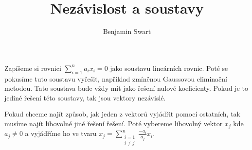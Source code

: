 \documentclass{article}
\title{Nezávislost a soustavy}
\author{Benjamin Swart}
\begin{document}
Zapíšeme si rovnici $\sum_{i=1}^{n}{a_i x_i} = 0$ jako soustavu lineárních rovnic. Poté se pokusíme tuto soustavu vyřešit, například zmíněnou Gaussovou eliminační metodou. Tato soustava bude vždy mít jako řešení nulové koeficienty. Pokud je to jediné řešení této soustavy, tak jsou vektory nezávislé.

Pokud chceme najít způsob, jak jeden z vektorů vyjádřit pomocí ostatních, tak musíme najít libovolné jiné řešení řešení. Poté vybereme libovolný vektor $x_j$ kde $a_j \neq 0$ a vyjádříme ho ve tvaru $x_j = \sum_{\substack{i = 1\\i \neq j}}^{n}{\frac{-a_i}{a_j} x_i}$.
\end{document}
